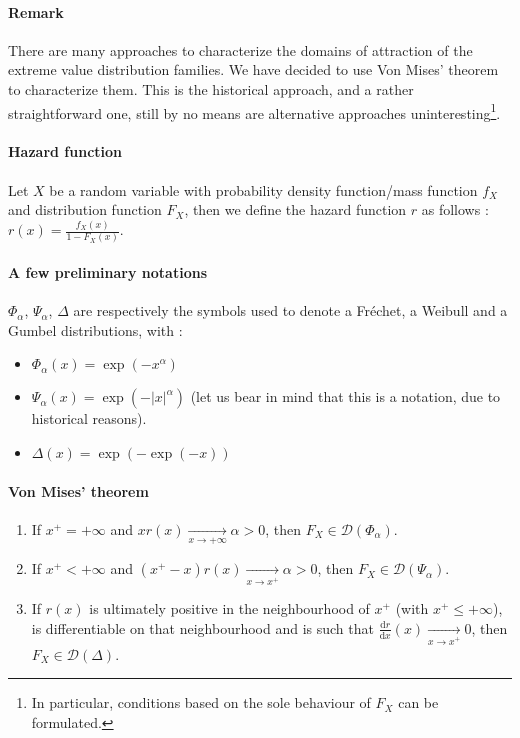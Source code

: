 \paragraph{Remark} There are many approaches to characterize the domains of attraction of the extreme value distribution families. We have decided to use Von Mises' theorem to characterize them. This is the historical approach, and a rather straightforward one, still by no means are alternative approaches uninteresting\footnote{In particular, conditions based on the sole behaviour of $F_X$ can be formulated.}.
\paragraph{Hazard function} Let $X$ be a random variable with probability density function/mass function $f_X$ and distribution function $F_X$, then we define the hazard function $r$ as follows : \newline
$r(x) = \frac{f_X(x)}{1 - F_X(x)}$.
\paragraph{A few preliminary notations} $\Phi_\alpha$, $\Psi_\alpha$, $\Delta$ are respectively the symbols used to denote a Fréchet, a Weibull and a Gumbel distributions, with :
\begin{itemize}
	\item $\Phi_\alpha(x) = \exp(- x^\alpha)$
	\item $\Psi_\alpha(x) = \exp(-  \lvert x \rvert^\alpha)$ (let us bear in mind that this is a notation, due to historical reasons).
	\item $\Delta(x) = \exp(- \exp(- x))$
\end{itemize}
\paragraph{Von Mises' theorem}
\begin{enumerate}
	\item If $x^+ = + \infty$ and $x r(x) \xrightarrow[x \rightarrow + \infty]{} \alpha > 0$, then $F_X \in \mathcal{D}(\Phi_\alpha)$.
	\item If $x^+ < + \infty$ and $(x^+ - x) r(x) \xrightarrow[x \rightarrow x^+]{} \alpha > 0$, then $F_X \in \mathcal{D}(\Psi_\alpha)$.
	\item If $r(x)$ is ultimately positive in the neighbourhood of $x^+$ (with $x^+ \le + \infty$), is differentiable on that neighbourhood and is such that $\frac{\mathrm{d}r}{\mathrm{d}x}(x) \xrightarrow[x \rightarrow x^+]{} 0$, then $F_X \in \mathcal{D}(\Delta)$.
\end{enumerate}

